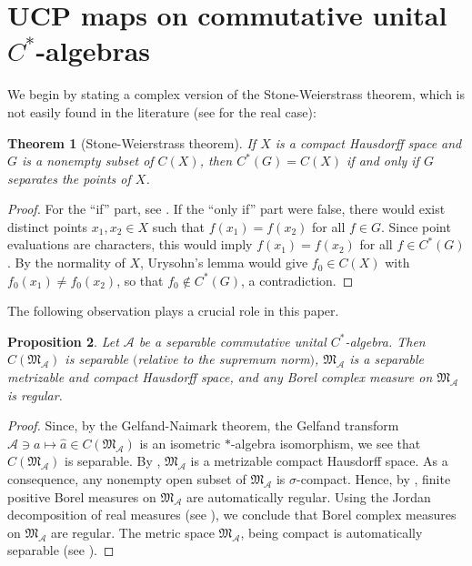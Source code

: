 \documentclass[reqno]{amsproc}
\numberwithin{equation}{section}
\newtheorem{theorem}{Theorem}[section]
\newtheorem{prop}[theorem]{Proposition}
\theoremstyle{remark}
\newcommand*{\ascr}{\mathscr{A}}
\theoremstyle{definition}
\begin{document}
   \section{UCP maps on commutative unital  $C^*$-algebras}
We begin by stating a complex version of the
Stone-Weierstrass theorem, which is not easily found
in the literature (see \cite[Theorem~44.7]{Will70} for
the real case):
   \begin{theorem}[Stone-Weierstrass theorem]
\label{wtysa}
If $X$ is a compact Hausdorff space and $G$
is a nonempty subset of $C(X)$, then
$C^*(G)=C(X)$ if and only if $G$ separates
the points of $X$.
   \end{theorem}
   \begin{proof}
For the ``if'' part, see \cite[Theorem~2.40]{Doug72}.
If the ``only if'' part were false, there would exist
distinct points $x_1,x_2 \in X$ such that
$f(x_1)=f(x_2)$ for all $f \in G$. Since point
evaluations are characters, this would imply
$f(x_1)=f(x_2)$ for all $f \in C^*(G)$. By the
normality of $X$, Urysohn's lemma would give $f_0 \in
C(X)$ with $f_0(x_1)\neq f_0(x_2)$, so that $f_0
\notin C^*(G)$, a contradiction.
   \end{proof}
The following observation plays a crucial role in this
paper.
   \begin{prop}\label{atrug}
Let $\ascr$ be a separable commutative unital
$C^*$-algebra. Then $C(\mathfrak{M}_{\ascr})$ is
separable $($relative to the supremum norm$)$,
$\mathfrak{M}_{\ascr}$ is a separable metrizable and
compact Hausdorff space, and any Borel complex measure
on $\mathfrak{M}_{\ascr}$ is regular.
   \end{prop}
   \begin{proof}
Since, by the Gelfand-Naimark theorem, the Gelfand
transform $\ascr\ni a\mapsto \widehat{a} \in
C(\mathfrak{M}_{\ascr})$ is an isometric $*$-algebra
isomorphism, we see that $C(\mathfrak{M}_{\ascr})$ is
separable. By \cite[Theorem~2.7]{Gr-Ro16},
$\mathfrak{M}_{\ascr}$ is a metrizable compact
Hausdorff space. As a consequence, any nonempty open
subset of $\mathfrak{M}_{\ascr}$ is $\sigma$-compact.
Hence, by \cite[Theorem~2.18]{Rud87}, finite positive
Borel measures on $\mathfrak{M}_{\ascr}$ are
automatically regular. Using the Jordan decomposition
of real measures (see \cite[Section~6.6]{Rud87}), we
conclude that Borel complex measures on
$\mathfrak{M}_{\ascr}$ are regular. The metric space
$\mathfrak{M}_{\ascr}$, being compact is automatically
separable (see \cite[Theorem~ IV.\S41.VI.1]{Kur68}).
   \end{proof}
\end{document}
